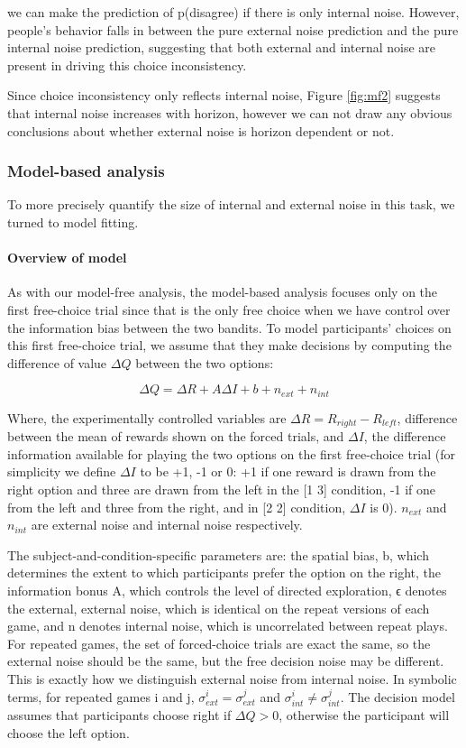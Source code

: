 \documentclass[12pt]{article}
\begin{document}
	we can make the prediction of p(disagree) if there is only internal noise. However, people's behavior falls in between the pure external noise prediction and the pure internal noise prediction, suggesting that both external and internal noise are present in driving this choice inconsistency.
	
	Since choice inconsistency only reflects internal noise, Figure \ref{fig:mf2} suggests that internal noise increases with horizon, however we can not draw any obvious conclusions about whether external noise is horizon dependent or not.
	
	\subsubsection*{Model-based analysis}
	To more precisely quantify the size of internal and external noise in this task, we turned to model fitting.
	
	\paragraph{Overview of model}
	As with our model-free analysis, the model-based analysis focuses only on the first free-choice trial since that is the only free choice when we have control over the information bias between the two bandits. To model participants’ choices on this first free-choice trial, we assume that they make decisions by computing the difference of value $\Delta Q$ between the two options:
	
	$$\Delta Q= \Delta R+A \Delta I+b+n_{ext}+n_{int}$$
	
	Where, the experimentally controlled variables are $\Delta R=R_{right}-R_{left}$, difference between the mean of rewards shown on the forced trials, and $\Delta I$, the difference information available for playing the two options on the first free-choice trial (for simplicity we define $\Delta I$ to be +1, -1 or 0: +1 if one reward is drawn from the right option and three are drawn from the left in the [1 3] condition, -1 if one from the left and three from the right, and in [2 2] condition, $\Delta I$ is 0). $n_{ext}$ and $n_{int}$ are external noise and internal noise respectively.
	
	The subject-and-condition-specific parameters are: the spatial bias, b, which determines the extent to which participants prefer the option on the right, the information bonus A, which controls the level of directed exploration, ϵ denotes the external, external noise, which is identical on the repeat versions of each game, and n denotes internal noise, which is uncorrelated between repeat plays. For repeated games, the set of forced-choice trials are exact the same, so the external noise should be the same, but the free decision noise may be different. This is exactly how we distinguish external noise from internal noise. In symbolic terms, for repeated games i and j,  $\sigma_{ext}^i=\sigma_{ext}^j$  and $\sigma_{int}^i \neq \sigma_{int}^j$.
	The decision model assumes that participants choose right if $\Delta Q > 0$, otherwise the participant will choose the left option.
	
\end{document}
